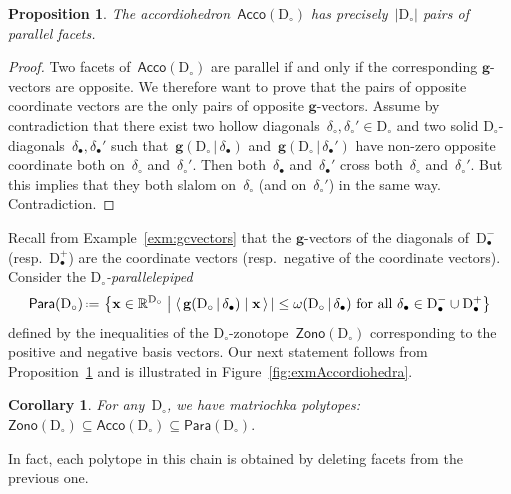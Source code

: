 \documentclass{amsart}
\newtheorem{corollary}[theorem]{Corollary}
\newtheorem{proposition}[theorem]{Proposition}
\theoremstyle{definition}
\newcommand{\R}{\mathbb{R}} %
\renewcommand{\b}[1]{\mathbf{#1}} %
\newcommand{\set}[2]{\left\{ #1 \;\middle|\; #2 \right\}} %
\newcommand{\dotprod}[2]{\left\langle \, #1 \; \middle| \; #2 \, \right\rangle} %
\newcommand{\eqdef}{\mbox{\,\raisebox{0.2ex}{\scriptsize\ensuremath{\mathrm:}}\ensuremath{=}\,}} %
\newcommand{\Acco}{\mathsf{Acco}} %
\newcommand{\Para}{\mathsf{Para}} %
\newcommand{\Zono}{\mathsf{Zono}} %
\newcommand{\fref}[1]{Figure~\ref{#1}} %
\newcommand{\darkblue}{\color{darkblue}} %
\newcommand{\defn}[1]{\textsl{\darkblue #1}} %
\newcommand{\dissection}{\mathrm{D}} %
\newcommand{\gvector}[2]{\mathbf{g}(#1 \,|\, #2)} %
\newcommand{\rhs}[2]{\omega(#1 \,|\, #2)} %
\newcommand{\mi}{-} %
\newcommand{\ma}{+} %
\begin{document}
\begin{proposition}
\label{prop:parallelFacets}
The accordiohedron~$\Acco(\dissection_\circ)$ has precisely~$|\dissection_\circ|$ pairs of parallel facets.
\end{proposition}

\begin{proof}
Two facets of~$\Acco(\dissection_\circ)$ are parallel if and only if the corresponding $\b{g}$-vectors are opposite. We therefore want to prove that the pairs of opposite coordinate vectors are the only pairs of opposite $\b{g}$-vectors. Assume by contradiction that there exist two hollow diagonals~$\delta_\circ, \delta_\circ' \in \dissection_\circ$ and two solid $\dissection_\circ$-diagonals~$\delta_\bullet, \delta_\bullet'$ such that~$\gvector{\dissection_\circ}{\delta_\bullet}$ and~$\gvector{\dissection_\circ}{\delta_\bullet'}$ have non-zero opposite coordinate both on~$\delta_\circ$ and~$\delta_\circ'$. Then both~$\delta_\bullet$ and~$\delta_\bullet'$ cross both~$\delta_\circ$ and~$\delta_\circ'$. But this implies that they both slalom on~$\delta_\circ$ (and on~$\delta_\circ'$) in the same way. Contradiction.
\end{proof}

Recall from Example~\ref{exm:gcvectors} that the $\b{g}$-vectors of the diagonals of~$\dissection_\bullet^\mi$ (resp.~$\dissection_\bullet^\ma$) are the coordinate vectors (resp.~negative of the coordinate vectors). Consider the \defn{$\dissection_\circ$-parallelepiped}
\[
\Para(\dissection_\circ) \eqdef \set{\b{x} \in \R^{\dissection_\circ}}{\dotprod{\gvector{\dissection_\circ}{\delta_\bullet}}{\b{x}}| \le \rhs{\dissection_\circ}{\delta_\bullet}\text{ for all } \delta_\bullet \in \dissection_\bullet^\mi \cup \dissection_\bullet^\ma}
\]
defined by the inequalities of the $\dissection_\circ$-zonotope~$\Zono(\dissection_\circ)$ corresponding to the positive and negative basis vectors. Our next statement follows from Proposition~\ref{prop:parallelFacets} and is illustrated in \fref{fig:exmAccordiohedra}.

\begin{corollary}
For any~$\dissection_\circ$, we have matriochka polytopes: 
\(
\Zono(\dissection_\circ) \subseteq \Acco(\dissection_\circ) \subseteq \Para(\dissection_\circ).
\)
\end{corollary}

In fact, each polytope in this chain is obtained by deleting facets from the previous one.

\newpage
\end{document}

